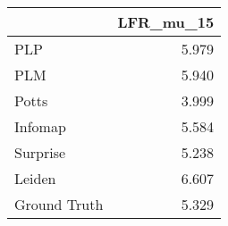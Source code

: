 \begin{tabular}{lr}
\toprule
{} & LFR_mu_15 \\
\midrule
PLP          &     5.979 \\
PLM          &     5.940 \\
Potts        &     3.999 \\
Infomap      &     5.584 \\
Surprise     &     5.238 \\
Leiden       &     6.607 \\
Ground Truth &     5.329 \\
\bottomrule
\end{tabular}
